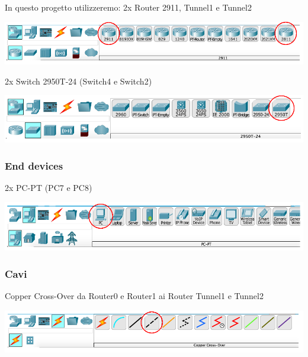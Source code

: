 In questo progetto utilizzeremo: 2x Router 2911, Tunnel1 e Tunnel2

\begin{center}
    \includegraphics[width=\linewidth]{images/07.routing-sicurezza/tunneling/01.routers.png}
\end{center}

2x Switch 2950T-24 (Switch4 e Switch2)

\begin{center}
    \includegraphics[width=\linewidth]{images/07.routing-sicurezza/tunneling/02.png}
\end{center}

\subsubsection*{End devices}
2x PC-PT (PC7 e PC8)

\begin{center}
    \includegraphics[width=\linewidth]{images/07.routing-sicurezza/tunneling/03.png}
\end{center}

\subsubsection*{Cavi}
Copper Cross-Over da Router0 e Router1 ai Router Tunnel1 e Tunnel2

\begin{center}
    \includegraphics[width=\linewidth]{images/07.routing-sicurezza/tunneling/04.png}
\end{center}

